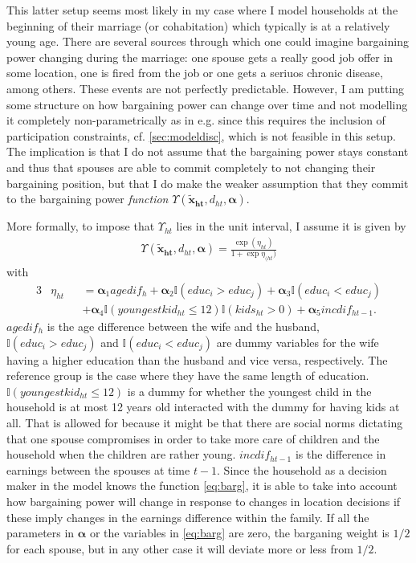 This latter setup seems most likely in my case where I model households at the beginning of their marriage (or cohabitation) which typically is at a relatively young age. There are several sources through which one could imagine bargaining power changing during the marriage: one spouse gets a really good job offer in some location, one is fired from the job or one gets a seriuos chronic disease, among others. These events are not perfectly predictable. However, I am putting some structure on how bargaining power can change over time and not modelling it completely non-parametrically as in e.g. \cite{Voena2015} since this requires the inclusion of participation constraints, cf. \autoref{sec:modeldisc}, which is not feasible in this setup. The implication is that I do not assume that the bargaining power stays constant and thus that spouses are able to commit completely to not changing their bargaining position, but that I do make the weaker assumption that they commit to the bargaining power \textit{function} $\Upsilon(\boldsymbol{\tilde{x}_{ht}},d_{ht},\boldsymbol{\alpha})$. 

More formally, to impose that $\Upsilon_{ht}$ lies in the unit interval, I assume it is given by 
\begin{align}
\Upsilon(\boldsymbol{\tilde{x}_{ht}},d_{ht},\boldsymbol{\alpha})= \frac{\exp{(\eta_{ht})}}{1+\exp{\eta_{(ht})}}
\label{eq:barg}
\end{align}
with
\begin{alignat*}{3}
&\eta_{ht}&&=\boldsymbol{\alpha}_1 agedif_h + \boldsymbol{\alpha}_2\mathbb{I}{(educ_i > educ_j)}+\boldsymbol{\alpha}_3\mathbb{I}{(educ_i < educ_j)} \\
& &&+ \boldsymbol{\alpha}_4 \mathbb{I}{(youngestkid_{ht}\leq 12)}\mathbb{I}{(kids_{ht}>0)} + \boldsymbol{\alpha}_5 incdif_{ht-1}.
\end{alignat*}
$agedif_h$ is the age difference between the wife and the husband, $\mathbb{I}{(educ_i > educ_j)}$ and $ \mathbb{I}{(educ_i < educ_j)}$
are dummy variables for the wife having a higher education than the husband and vice versa, respectively. The reference group is the case where they have the same length of education. $\mathbb{I}{(youngestkid_{ht} \leq 12)}$ is a dummy for whether the youngest child in the household is at most 12 years old interacted with the dummy for having kids at all. That is allowed for because it might be that there are social norms dictating that one spouse compromises in order to take more care of children and the household when the children are rather young. $incdif_{ht-1}$ is the difference in earnings between the spouses at time $t-1$. Since the household as a decision maker in the model knows the function \eqref{eq:barg}, it is able to take into account how bargaining power will change in response to changes in location decisions if these imply changes in the earnings difference within the family. 
If all the parameters in $\boldsymbol{\alpha}$ or the variables in \eqref{eq:barg} are zero, the barganing weight is $1/2$ for each spouse, but in any other case it will deviate more or less from $1/2$.

